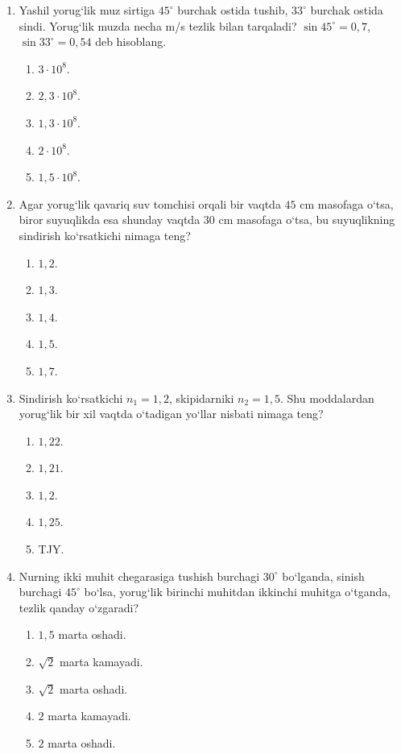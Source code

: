 \begin{enumerate}
\item Yashil yorug‘lik muz sirtiga $45^\circ$ burchak ostida tushib, $33^\circ$ burchak ostida sindi. Yorug‘lik muzda necha m/s tezlik bilan tarqaladi? $\sin45^\circ=0,7$, $\sin33^\circ=0,54$ deb hisoblang.
\begin{enumerate}[label=\Alph*)]
\item $3\cdot10^8$.
\item $2,3\cdot10^8$.
\item $1,3\cdot10^8$.
\item $2\cdot10^8$.
\item $1,5\cdot10^8$.
\end{enumerate}

\item Agar yorug‘lik qavariq suv tomchisi orqali bir vaqtda $45$ cm masofaga o‘tsa, biror suyuqlikda esa shunday vaqtda $30$ cm masofaga o‘tsa, bu suyuqlikning sindirish ko‘rsatkichi nimaga teng?
\begin{enumerate}[label=\Alph*)]
\item $1,2$.
\item $1,3$.
\item $1,4$.
\item $1,5$.
\item $1,7$.
\end{enumerate}

\item Sindirish ko‘rsatkichi $n_1=1,2$, skipidarniki $n_2=1,5$. Shu moddalardan yorug‘lik bir xil vaqtda o‘tadigan yo‘llar nisbati nimaga teng?
\begin{enumerate}[label=\Alph*)]
\item $1,22$.
\item $1,21$.
\item $1,2$.
\item $1,25$.
\item TJY.
\end{enumerate}

\item Nurning ikki muhit chegarasiga tushish burchagi $30^\circ$ bo‘lganda, sinish burchagi $45^\circ$ bo‘lsa, yorug‘lik birinchi muhitdan ikkinchi muhitga o‘tganda, tezlik qanday o‘zgaradi?
\begin{enumerate}[label=\Alph*)]
\item $1,5$ marta oshadi.
\item $\sqrt{2}$ marta kamayadi.
\item $\sqrt{2}$ marta oshadi.
\item $2$ marta kamayadi.
\item $2$ marta oshadi.
\end{enumerate}


\end{enumerate}
